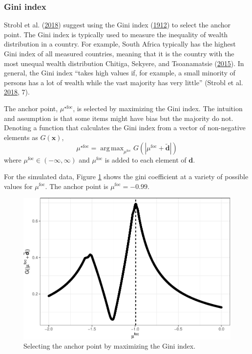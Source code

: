 \documentclass[
  11pt,
]{article}
\begin{document}
\hypertarget{gini-index}{%
\subsubsection{Gini index}\label{gini-index}}

Strobl et al. (\protect\hyperlink{ref-strobl2018anchor}{2018}) suggest using the Gini index (\protect\hyperlink{ref-gini1912variabilita}{1912}) to select the anchor point. The Gini index is typically used to measure the inequality of wealth distribution in a country. For example, South Africa typically has the highest Gini index of all measured countries, meaning that it is the country with the most unequal wealth distribution Chitiga, Sekyere, and Tsoanamatsie (\protect\hyperlink{ref-chitiga2015income}{2015}). In general, the Gini index \enquote{takes high values if, for example, a small minority of persons has a lot of wealth while the vast majority has very little} (Strobl et al. \protect\hyperlink{ref-strobl2018anchor}{2018}, 7).

The anchor point, \(\mu^{\star\text{foc}}\), is selected by maximizing the Gini index. The intuition and assumption is that some items might have bias but the majority do not. Denoting a function that calculates the Gini index from a vector of non-negative elements as \(G(\mathbf{x})\),
\[
\mu^{\star\text{foc}} = \mathop\mathrm{arg\,max}_{\mu^\text{foc}} G(|\mu^\text{foc} + \tilde{\mathbf{d}}|)
\]
where \(\mu^\text{foc} \in (-\infty, \infty)\) and \(\mu^\text{foc}\) is added to each element of \(\mathbf{d}\).

For the simulated data, Figure \ref{fig:ginipath} shows the gini coefficient at a variety of possible values for \(\mu^\text{foc}\). The anchor point is \(\mu^\text{foc} = -0.99\).

\begin{figure}[H]

{\centering \includegraphics[width=0.7\linewidth]{paper_files/figure-latex/ginipath-1} 

}

\caption{Selecting the anchor point by maximizing the Gini index.}\label{fig:ginipath}
\end{figure}
\end{document}
